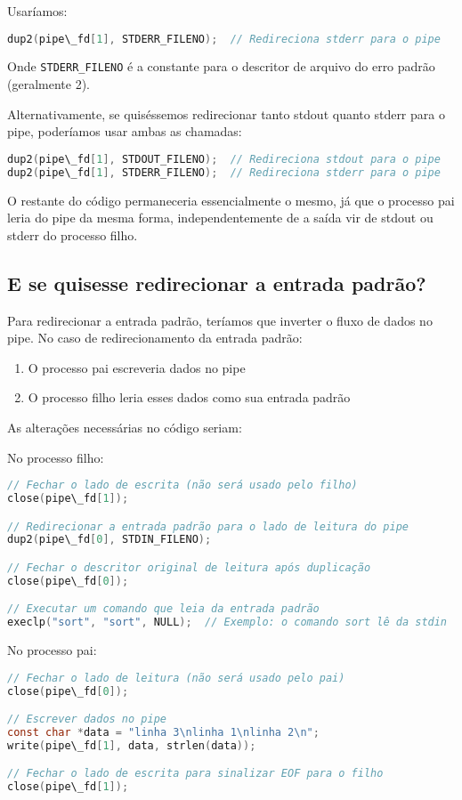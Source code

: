 \documentclass[12pt]{article}
\begin{document}
Usaríamos:
\begin{lstlisting}[language=C]
dup2(pipe\_fd[1], STDERR_FILENO);  // Redireciona stderr para o pipe
\end{lstlisting}

Onde \texttt{STDERR\_FILENO} é a constante para o descritor de arquivo do erro padrão (geralmente 2).

Alternativamente, se quiséssemos redirecionar tanto stdout quanto stderr para o pipe, poderíamos usar ambas as chamadas:
\begin{lstlisting}[language=C]
dup2(pipe\_fd[1], STDOUT_FILENO);  // Redireciona stdout para o pipe
dup2(pipe\_fd[1], STDERR_FILENO);  // Redireciona stderr para o pipe
\end{lstlisting}

O restante do código permaneceria essencialmente o mesmo, já que o processo pai leria do pipe da mesma forma, independentemente de a saída vir de stdout ou stderr do processo filho.

\subsection{E se quisesse redirecionar a entrada padrão?}

Para redirecionar a entrada padrão, teríamos que inverter o fluxo de dados no pipe. No caso de redirecionamento da entrada padrão:

\begin{enumerate}
    \item O processo pai escreveria dados no pipe
    \item O processo filho leria esses dados como sua entrada padrão
\end{enumerate}

As alterações necessárias no código seriam:

No processo filho:
\begin{lstlisting}[language=C]
// Fechar o lado de escrita (não será usado pelo filho)
close(pipe\_fd[1]);

// Redirecionar a entrada padrão para o lado de leitura do pipe
dup2(pipe\_fd[0], STDIN_FILENO);

// Fechar o descritor original de leitura após duplicação
close(pipe\_fd[0]);

// Executar um comando que leia da entrada padrão
execlp("sort", "sort", NULL);  // Exemplo: o comando sort lê da stdin
\end{lstlisting}

No processo pai:
\begin{lstlisting}[language=C]
// Fechar o lado de leitura (não será usado pelo pai)
close(pipe\_fd[0]);

// Escrever dados no pipe
const char *data = "linha 3\nlinha 1\nlinha 2\n";
write(pipe\_fd[1], data, strlen(data));

// Fechar o lado de escrita para sinalizar EOF para o filho
close(pipe\_fd[1]);
\end{lstlisting}
\end{document}
